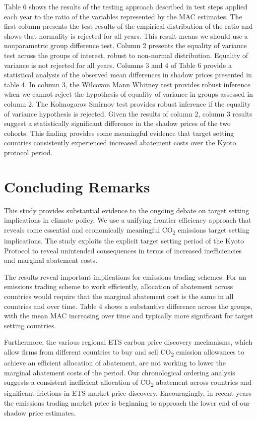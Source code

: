 \documentclass[
  10pt,
]{article}
\begin{document}
Table 6 shows the results of the testing approach described in test
steps applied each year to the ratio of the variables represented by the
MAC estimates. The first column presents the test results of the
empirical distribution of the ratio and shows that normality is rejected
for all years. This result means we should use a nonparametric group
difference test. Column 2 presents the equality of variance test across
the groups of interest, robust to non-normal distribution. Equality of
variance is not rejected for all years. Columns 3 and 4 of Table 6
provide a statistical analysis of the observed mean differences in
shadow prices presented in table 4. In column 3, the Wilcoxon Mann
Whitney test provides robust inference when we cannot reject the
hypothesis of equality of variance in groups assessed in column 2. The
Kolmogorov Smirnov test provides robust inference if the equality of
variance hypothesis is rejected. Given the results of column 2, column 3
results suggest a statistically significant difference in the shadow
prices of the two cohorts. This finding provides some meaningful
evidence that target setting countries consistently experienced
increased abatement costs over the Kyoto protocol period. \newpage

\hypertarget{concluding-remarks}{%
\section{Concluding Remarks}\label{concluding-remarks}}

This study provides substantial evidence to the ongoing debate on target
setting implications in climate policy. We use a unifying frontier
efficiency approach that reveals some essential and economically
meaningful CO\textsubscript{2} emissions target setting implications.
The study exploits the explicit target setting period of the Kyoto
Protocol to reveal unintended consequences in terms of increased
inefficiencies and marginal abatement costs.

The results reveal important implications for emissions trading schemes.
For an emissions trading scheme to work efficiently, allocation of
abatement across countries would require that the marginal abatement
cost is the same in all countries and over time. Table 4 shows a
substantive difference across the groups, with the mean MAC increasing
over time and typically more significant for target setting countries.

Furthermore, the various regional ETS carbon price discovery mechanisms,
which allow firms from different countries to buy and sell
CO\textsubscript{2} emission allowances to achieve an efficient
allocation of abatement, are not working to lower the marginal abatement
costs of the period. Our chronological ordering analysis suggests a
consistent inefficient allocation of CO\textsubscript{2} abatement
across countries and significant frictions in ETS market price
discovery. Encouragingly, in recent years the emissions trading market
price is beginning to approach the lower end of our shadow price
estimates.
\end{document}
